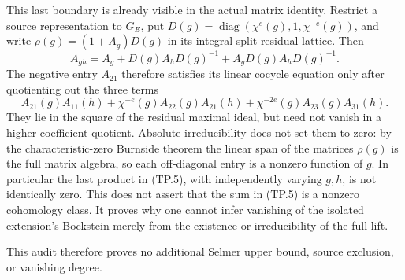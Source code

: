 This last boundary is already visible in the actual matrix
identity.  Restrict a source representation to \(G_E\), put
\(D(g)=\operatorname{diag}(\chi^e(g),1,\chi^{-e}(g))\),
and write \(\rho(g)=(1+A_g)D(g)\) in its integral
split-residual lattice.  Then
\[
 A_{gh}=A_g+D(g)A_hD(g)^{-1}
                    +A_gD(g)A_hD(g)^{-1}.
 \tag{TP.4}
\]
The negative entry \(A_{21}\) therefore satisfies its
linear cocycle equation only after quotienting out the
three terms
\[
 A_{21}(g)A_{11}(h)
 +\chi^{-e}(g)A_{22}(g)A_{21}(h)
 +\chi^{-2e}(g)A_{23}(g)A_{31}(h).
 \tag{TP.5}
\]
They lie in the square of the residual maximal ideal,
but need not vanish in a higher coefficient quotient.
Absolute irreducibility does not set them to zero:
by the characteristic-zero Burnside theorem the linear
span of the matrices \(\rho(g)\) is the full matrix
algebra, so each off-diagonal entry is a nonzero
function of \(g\).  In particular the last product
in (TP.5), with independently varying \(g,h\), is
not identically zero.  This does not assert that
the sum in (TP.5) is a nonzero cohomology class.
It proves why one cannot infer vanishing of the
isolated extension's Bockstein merely from the
existence or irreducibility of the full lift.

This audit therefore proves no additional Selmer
upper bound, source exclusion, or vanishing degree.
